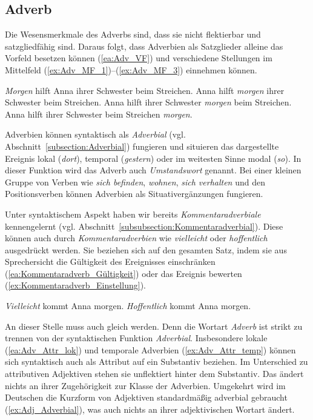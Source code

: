 \subsection{Adverb}\label{subsection:Adverb}

Die Wesensmerkmale des Adverbs sind, dass sie nicht flektierbar und satzgliedfähig sind. Daraus folgt, dass Adverbien als Satzglieder alleine das Vorfeld besetzen können (\ref{ea:Adv_VF}) und verschiedene Stellungen im Mittelfeld (\ref{ex:Adv_MF_1})--(\ref{ex:Adv_MF_3}) einnehmen können.

\ea \label{ea:Adverb_Stellung}
\ea \label{ea:Adv_VF} \textit{Morgen} hilft Anna ihrer Schwester beim Streichen.
\ex \label{ex:Adv_MF_1} Anna hilft \textit{morgen} ihrer Schwester beim Streichen.
\ex \label{ex:Adv_MF_2} Anna hilft ihrer Schwester \textit{morgen} beim Streichen.
\ex \label{ex:Adv_MF_3} Anna hilft ihrer Schwester beim Streichen \textit{morgen}.
\z 
\z 

Adverbien können syntaktisch als \textit{Adverbial} (vgl. Abschnitt~\ref{subsection:Adverbial}) fungieren und situieren das dargestellte Ereignis lokal (\textit{dort}), temporal (\textit{gestern}) oder im weitesten Sinne modal (\textit{so}). In dieser Funktion wird das Adverb auch \textit{Umstandswort} genannt. Bei einer kleinen Gruppe von Verben wie \textit{sich befinden}, \textit{wohnen}, \textit{sich verhalten} und den Positionsverben können Adverbien als Situativergänzungen fungieren.

Unter syntaktischem Aspekt haben wir bereits \textit{Kommentaradverbiale} kennengelernt (vgl. Abschnitt~\ref{subsubsection:Kommentaradverbial}). Diese können auch durch \textit{Kommentaradverbien} wie \textit{vielleicht} oder \textit{hoffentlich} ausgedrückt werden. Sie beziehen sich auf den gesamten Satz, indem sie aus Sprechersicht die Gültigkeit des Ereignisses einschränken (\ref{ea:Kommentaradverb_Gültigkeit}) oder das Ereignis bewerten (\ref{ex:Kommentaradverb_Einstellung}).

\ea \label{ea:Kommentaradverb}
\ea \label{ea:Kommentaradverb_Gültigkeit} \textit{Vielleicht} kommt Anna morgen.
\ex \label{ex:Kommentaradverb_Einstellung} \textit{Hoffentlich} kommt Anna morgen.
\z 
\z 

An dieser Stelle muss auch gleich  werden. Denn die Wortart \textit{Adverb} ist strikt zu trennen von der syntaktischen Funktion \textit{Adverbial}. Insbesondere lokale (\ref{ea:Adv_Attr_lok}) und temporale Adverbien (\ref{ex:Adv_Attr_temp}) können sich syntaktisch auch als Attribut auf ein Substantiv beziehen. Im Unterschied zu attributiven Adjektiven stehen sie unflektiert hinter dem Substantiv. Das ändert nichts an ihrer Zugehörigkeit zur Klasse der Adverbien. Umgekehrt wird im Deutschen die Kurzform von Adjektiven standardmäßig adverbial gebraucht (\ref{ex:Adj_Adverbial}), was auch nichts an ihrer adjektivischen Wortart ändert. 

